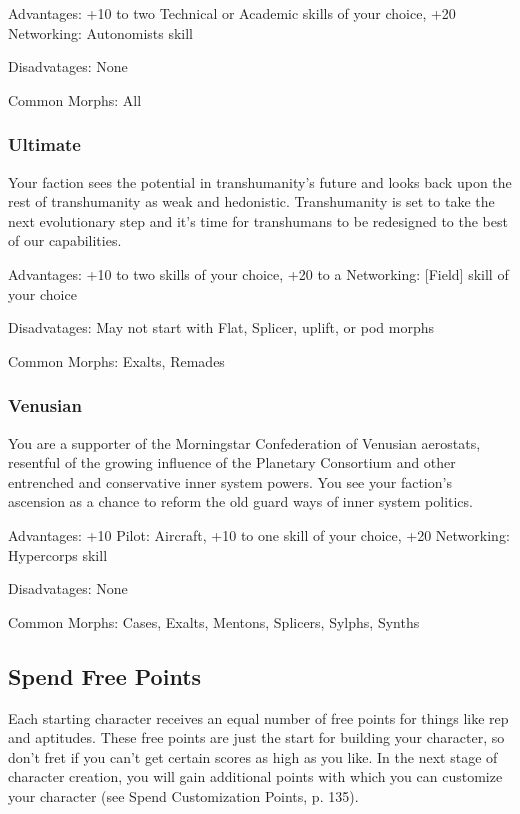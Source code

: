 Advantages: +10 to two Technical or Academic skills of your choice, +20 Networking: Autonomists skill

Disadvatages: None

Common Morphs: All

\subsubsection{Ultimate}
\label{sec:ultimate}

Your faction sees the potential in transhumanity’s future and looks back upon the rest of transhumanity as weak and hedonistic. Transhumanity is set to take the next evolutionary step and it’s time for transhumans to be redesigned to the best of our capabilities.

Advantages: +10 to two skills of your choice, +20 to a Networking: [Field] skill of your choice

Disadvatages: May not start with Flat, Splicer, uplift, or pod morphs

Common Morphs: Exalts, Remades

\subsubsection{Venusian}
\label{sec:venusian}

You are a supporter of the Morningstar Confederation of Venusian aerostats, resentful of the growing influence of the Planetary Consortium and other entrenched and conservative inner system powers. You see your faction’s ascension as a chance to reform the old guard ways of inner system politics.

Advantages: +10 Pilot: Aircraft, +10 to one skill of your choice, +20 Networking: Hypercorps skill

Disadvatages: None

Common Morphs: Cases, Exalts, Mentons, Splicers, Sylphs, Synths

\subsection{Spend Free Points}
\label{sec:spend-free-points}

Each starting character receives an equal number of free points for things like rep and aptitudes. These free points are just the start for building your character, so don’t fret if you can’t get certain scores as high as you like. In the next stage of character creation, you will gain additional points with which you can customize your character (see Spend Customization Points, p. 135).

